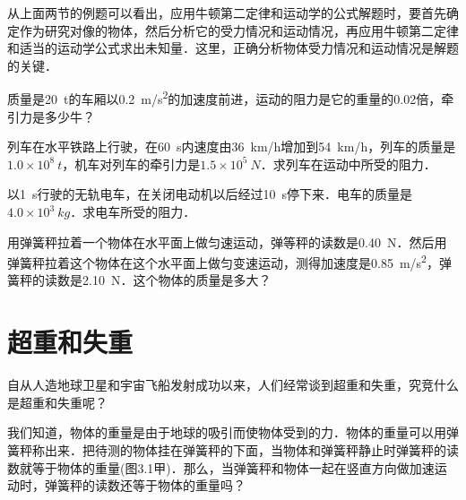 \begin{Test}
从上面两节的例题可以看出，应用牛顿第二定律和运动学的公式解题时，要首先确定作为研究对像的物体，然后分析它的受力情况和运动情况，再应用牛顿第二定律和适当的运动学公式求出未知量．这里，正确分析物体受力情况和运动情况是解题的关键．


\begin{Exercise}
	\begin{QsNum}
		\item 质量是\SI{20}{t}的车厢以\SI{0.2}{m/s^2}的加速度前进，运动的阻力是它的重量的0.02倍，牵引力是多少牛？
		\item  列车在水平铁路上行驶，在\SI{60}{s}内速度由\SI{36}{km/h}增加到\SI{54}{km/h}，列车的质量是$1.0\times 10^8~\si{t}$，机车对列车的牵引力是$1.5\times 10^5~\si{N}$．求列车在运动中所受的阻力．
		\item  以\SI{1}{s}行驶的无轨电车，在关闭电动机以后经过\SI{10}{s}停下来．电车的质量是$4.0\times 10^3~\si{kg}$．求电车所受的阻力．
		\item  用弹簧秤拉着一个物体在水平面上做匀速运动，弹等秤的读数是\SI{0.40}{N}．然后用弹簧秤拉着这个物体在这个水平面上做匀变速运动，测得加速度是\SI{0.85}{m/s^2}，弹簧秤的读数是\SI{2.10}{N}．这个物体的质量是多大？
	\end{QsNum}
\end{Exercise}





\section{超重和失重}
自从人造地球卫星和宇宙飞船发射成功以来，人们经常谈到超重和失重，究竞什么是超重和失重呢？

我们知道，物体的重量是由于地球的吸引而使物体受到的力．物体的重量可以用弹簧秤称出来．把待测的物体挂在弹簧秤的下面，当物体和弹簧秤静止时弹簧秤的读数就等于物体的重量(图3.1甲)．那么，当弹簧秤和物体一起在竖直方向做加速运动时，弹簧秤的读数还等于物体的重量吗？


\end{Test}
